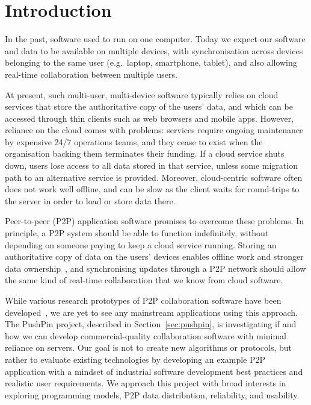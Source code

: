 \documentclass[sigplan,10pt]{acmart}
\begin{document}


\maketitle

\section{Introduction}

In the past, software used to run on one computer.
Today we expect our software and data to be available on multiple devices, with synchronisation across devices belonging to the same user (e.g.\ laptop, smartphone, tablet), and also allowing real-time collaboration between multiple users.

At present, such multi-user, multi-device software typically relies on cloud services that store the authoritative copy of the users' data, and which can be accessed through thin clients such as web browsers and mobile apps.
However, reliance on the cloud comes with problems: services require ongoing maintenance by expensive 24/7 operations teams, and they cease to exist when the organisation backing them terminates their funding.
If a cloud service shuts down, users lose access to all data stored in that service, unless some migration path to an alternative service is provided.
Moreover, cloud-centric software often does not work well offline, and can be slow as the client waits for round-trips to the server in order to load or store data there.

Peer-to-peer (P2P) application software promises to overcome these problems.
In principle, a P2P system should be able to function indefinitely, without depending on someone paying to keep a cloud service running.
Storing an authoritative copy of data on the users' devices enables offline work and stronger data ownership~\cite{LocalFirst}, and synchronising updates through a P2P network should allow the same kind of real-time collaboration that we know from cloud software.

While various research prototypes of P2P collaboration software have been developed~\cite{Nedelec:2016eo,vanderLinde:2017fu,Nicolaescu:2016ei}, we are yet to see any mainstream applications using this approach.
The PushPin project, described in Section~\ref{sec:pushpin}, is investigating if and how we can develop commercial-quality collaboration software with minimal reliance on servers.
Our goal is not to create new algorithms or protocols, but rather to evaluate existing technologies by developing an example P2P application with a mindset of industrial software development best practices and realistic user requirements.
We approach this project with broad interests in exploring programming models, P2P data distribution, reliability, and usability.
\end{document}
